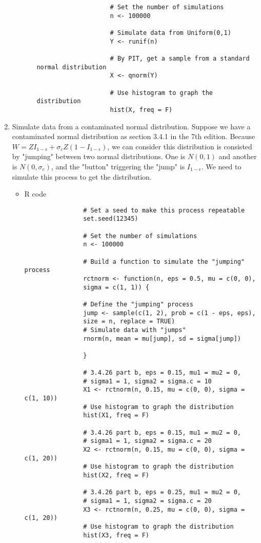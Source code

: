 \begin{enumerate}
\begin{enumerate}
\begin{itemize}
\begin{verbatim}
					# Set the number of simulations
					n <- 100000
					
					# Simulate data from Uniform(0,1)
					Y <- runif(n)
					
					# By PIT, get a sample from a standard normal distribution
					X <- qnorm(Y)
					
					# Use histogram to graph the distribution
					hist(X, freq = F)
					\end{verbatim}
				\end{itemize}
				
		\end{enumerate}
	\item Simulate data from a contaminated normal distribution. Suppose we have a contaminated normal distribution as section 3.4.1 in the 7th edition. Because $W = ZI_{1-\epsilon} + \sigma_c Z (1 - I_{1 - \epsilon})$, we can consider this distribution is consisted by "jumping" between two normal distributions. One is $N(0, 1)$ and another is $N(0, \sigma_c)$, and the "button" triggering the "jump" is $I_{1-\epsilon}$. We need to simulate this process to get the distribution.
		\begin{itemize}
			\item R code
			\begin{verbatim}
				# Set a seed to make this process repeatable
				set.seed(12345) 
				
				# Set the number of simulations
				n <- 100000
				
				# Build a function to simulate the "jumping" process
				rctnorm <- function(n, eps = 0.5, mu = c(0, 0), 
				sigma = c(1, 1)) {
				
				# Define the "jumping" process
				jump <- sample(c(1, 2), prob = c(1 - eps, eps), 
				size = n, replace = TRUE)
				# Simulate data with "jumps"
				rnorm(n, mean = mu[jump], sd = sigma[jump])
				
				}
				
				# 3.4.26 part b, eps = 0.15, mu1 = mu2 = 0, 
				# sigma1 = 1, sigma2 = sigma.c = 10
				X1 <- rctnorm(n, 0.15, mu = c(0, 0), sigma = c(1, 10))
				# Use histogram to graph the distribution
				hist(X1, freq = F)
				
				# 3.4.26 part b, eps = 0.15, mu1 = mu2 = 0, 
				# sigma1 = 1, sigma2 = sigma.c = 20
				X2 <- rctnorm(n, 0.15, mu = c(0, 0), sigma = c(1, 20))
				# Use histogram to graph the distribution
				hist(X2, freq = F)
				
				# 3.4.26 part b, eps = 0.25, mu1 = mu2 = 0, 
				# sigma1 = 1, sigma2 = sigma.c = 20
				X3 <- rctnorm(n, 0.25, mu = c(0, 0), sigma = c(1, 20))
				# Use histogram to graph the distribution
				hist(X3, freq = F)
				

\end{verbatim}
\end{itemize}
\end{enumerate}
